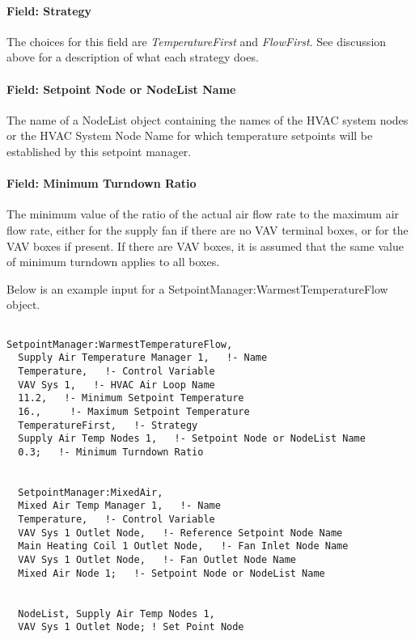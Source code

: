 \paragraph{Field: Strategy}\label{field-strategy-2}

The choices for this field are \emph{TemperatureFirst} and \emph{FlowFirst}. See discussion above for a description of what each strategy does.

\paragraph{Field: Setpoint Node or NodeList Name}\label{field-setpoint-node-or-nodelist-name-12}

The name of a NodeList object containing the names of the HVAC system nodes or the HVAC System Node Name for which temperature setpoints will be established by this setpoint manager.

\paragraph{Field: Minimum Turndown Ratio}\label{field-minimum-turndown-ratio}

The minimum value of the ratio of the actual air flow rate to the maximum air flow rate, either for the supply fan if there are no VAV terminal boxes, or for the VAV boxes if present. If there are VAV boxes, it is assumed that the same value of minimum turndown applies to all boxes.

Below is an example input for a SetpointManager:WarmestTemperatureFlow object.

\begin{lstlisting}

SetpointManager:WarmestTemperatureFlow,
  Supply Air Temperature Manager 1,   !- Name
  Temperature,   !- Control Variable
  VAV Sys 1,   !- HVAC Air Loop Name
  11.2,   !- Minimum Setpoint Temperature
  16.,     !- Maximum Setpoint Temperature
  TemperatureFirst,   !- Strategy
  Supply Air Temp Nodes 1,   !- Setpoint Node or NodeList Name
  0.3;   !- Minimum Turndown Ratio


  SetpointManager:MixedAir,
  Mixed Air Temp Manager 1,   !- Name
  Temperature,   !- Control Variable
  VAV Sys 1 Outlet Node,   !- Reference Setpoint Node Name
  Main Heating Coil 1 Outlet Node,   !- Fan Inlet Node Name
  VAV Sys 1 Outlet Node,   !- Fan Outlet Node Name
  Mixed Air Node 1;   !- Setpoint Node or NodeList Name


  NodeList, Supply Air Temp Nodes 1,
  VAV Sys 1 Outlet Node; ! Set Point Node
\end{lstlisting}

